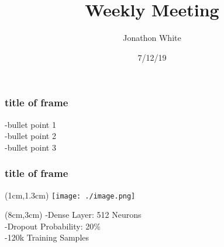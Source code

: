 \documentclass{beamer}
\title{Weekly Meeting}
\author{Jonathon White}
\date{7/12/19}
\begin{document}
\maketitle

\begin{frame}
\frametitle{title of frame}
-bullet point 1\\
-bullet point 2\\
-bullet point 3\\
\end{frame}

\begin{frame}
\frametitle{title of frame}
\begin{textblock*}{5cm}(1cm,1.3cm)
\texttt{[image: ./image.png]}
\end{textblock*}
\begin{textblock*}{5cm}(8cm,3cm)
	-Dense Layer: 512 Neurons\\
	-Dropout Probability: 20\%\\
	-120k Training Samples\\
\end{textblock*}
\end{frame}
\end{document}
